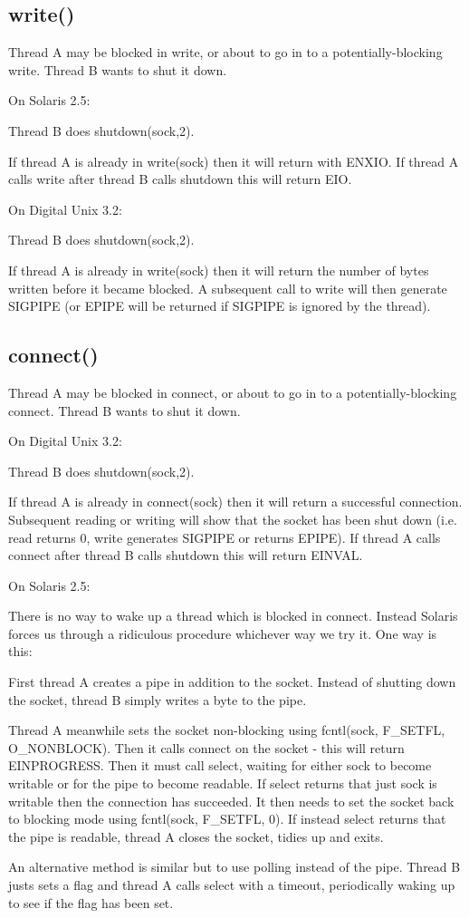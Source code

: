 \documentclass[11pt]{article}
\begin{document}
\subsection{write()}

Thread A may be blocked in write, or about to go in to a potentially-blocking
write.  Thread B wants to shut it down.

On Solaris 2.5:

Thread B does shutdown(sock,2).

If thread A is already in write(sock) then it will return with ENXIO.  If
thread A calls write after thread B calls shutdown this will return EIO.


On Digital Unix 3.2:

Thread B does shutdown(sock,2).

If thread A is already in write(sock) then it will return the number of bytes
written before it became blocked.  A subsequent call to write will then
generate SIGPIPE (or EPIPE will be returned if SIGPIPE is ignored by the
thread).


\subsection{connect()}

Thread A may be blocked in connect, or about to go in to a potentially-blocking
connect.  Thread B wants to shut it down.


On Digital Unix 3.2:

Thread B does shutdown(sock,2).

If thread A is already in connect(sock) then it will return a successful
connection.  Subsequent reading or writing will show that the socket has been
shut down (i.e. read returns 0, write generates SIGPIPE or returns EPIPE).  If
thread A calls connect after thread B calls shutdown this will return EINVAL.


On Solaris 2.5:

There is no way to wake up a thread which is blocked in connect.  Instead
Solaris forces us through a ridiculous procedure whichever way we try it.
One way is this:

First thread A creates a pipe in addition to the socket.  Instead of shutting
down the socket, thread B simply writes a byte to the pipe.

Thread A meanwhile sets the socket non-blocking using fcntl(sock, F\_SETFL,
O\_NONBLOCK).  Then it calls connect on the socket - this will return
EINPROGRESS.  Then it must call select, waiting for either sock to become
writable or for the pipe to become readable.  If select returns that just sock
is writable then the connection has succeeded.  It then needs to set the socket
back to blocking mode using fcntl(sock, F\_SETFL, 0).  If instead select
returns that the pipe is readable, thread A closes the socket, tidies up and
exits.

An alternative method is similar but to use polling instead of the pipe.
Thread B justs sets a flag and thread A calls select with a timeout,
periodically waking up to see if the flag has been set.
\end{document}
